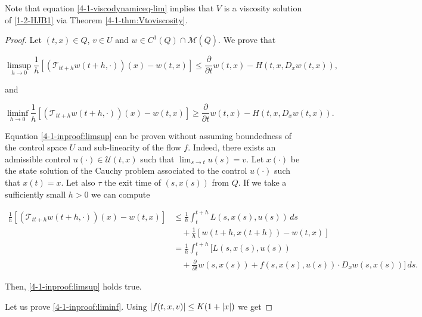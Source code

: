 \vspace{5mm}

Note that equation \ref{4-1-viscodynamiceq-lim} implies that $V$ is a viscosity solution of \ref{1-2-HJB1} via Theorem \ref{4-1-thm:Vtoviscosity}.

\vspace{5mm}

\begin{proof}

    Let $(t,x)\in Q$, $v\in U$ and $w\in C^1(Q)\cap\mathcal{M}(\overline{Q})$. We prove that
    
    \begin{equation}\label{4-1-inproof:limsup}\limsup_{h\to0}\frac{1}{h}\left[(\mathcal{T}_{tt+h}w(t+h,\cdot))(x)-w(t,x)\right]\leq\frac{\partial}{\partial t}w(t,x) - H(t,x,D_xw(t,x)),\end{equation}

    and 

    \begin{equation}\label{4-1-inproof:liminf}\liminf_{h\to0}\frac{1}{h}\left[(\mathcal{T}_{tt+h}w(t+h,\cdot))(x)-w(t,x)\right]\geq\frac{\partial}{\partial t}w(t,x) - H(t,x,D_xw(t,x)).\end{equation}
    
    Equation \ref{4-1-inproof:limsup} can be proven without assuming boundedness of the control space $U$ and sub-linearity of the flow $f$. Indeed, there exists an admissible control $u(\cdot)\in \mathcal{U}(t,x)$ 
    such that $\lim_{s\to t}u(s)=v$. Let $x(\cdot)$ be the state solution of the Cauchy problem associated 
    to the control $u(\cdot)$ such that $x(t)=x$. Let also $\tau$ the exit time of $(s,x(s))$ from $Q$. If we take a sufficiently small $h>0$ we can compute
    
    \begin{align*}
        \frac{1}{h}\left[(\mathcal{T}_{tt+h}w(t+h,\cdot))(x)-w(t,x)\right] & \leq \frac{1}{h}\int_t^{t+h}L(s,x(s),u(s))\,ds \\
        & \quad + \frac{1}{h}\left[w(t+h,x(t+h))-w(t,x)\right] \\
        & =  \frac{1}{h}\int_t^{t+h}\bigg[L(s,x(s),u(s)) \\ 
        & \quad + \frac{\partial}{\partial t}w(s,x(s)) + f(s,x(s),u(s))\cdot D_xw(s,x(s))\bigg]\,ds.
    \end{align*}
    
    Then, \ref{4-1-inproof:limsup} holds true. 
    
    Let us prove \ref{4-1-inproof:liminf}. Using $\abs{f(t,x,v)}\leq K(1+\abs{x})$ we get


\end{proof}
